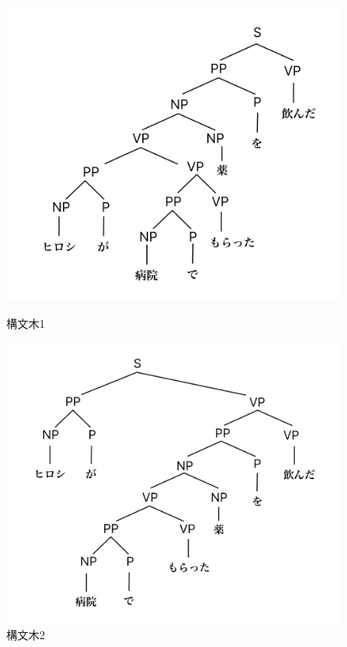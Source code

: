 \documentclass[dvipdfmx,autodetect-engine,titlepage]{jsarticle}
\begin{document}
\begin{figure}[h]
  \centering
  \begin{minipage}[b]{0.45\linewidth}
  \begin{center}
    \includegraphics[keepaspectratio,scale=0.18]{tree1.png}
    \end{center}
    \caption{構文木1}
  \end{minipage}
  \begin{minipage}[b]{0.45\linewidth}
  \begin{center}
    \includegraphics[keepaspectratio,scale=0.18]{tree2.png}
    \end{center}
    \caption{構文木2}
  \end{minipage}
\end{figure}
\end{document}
